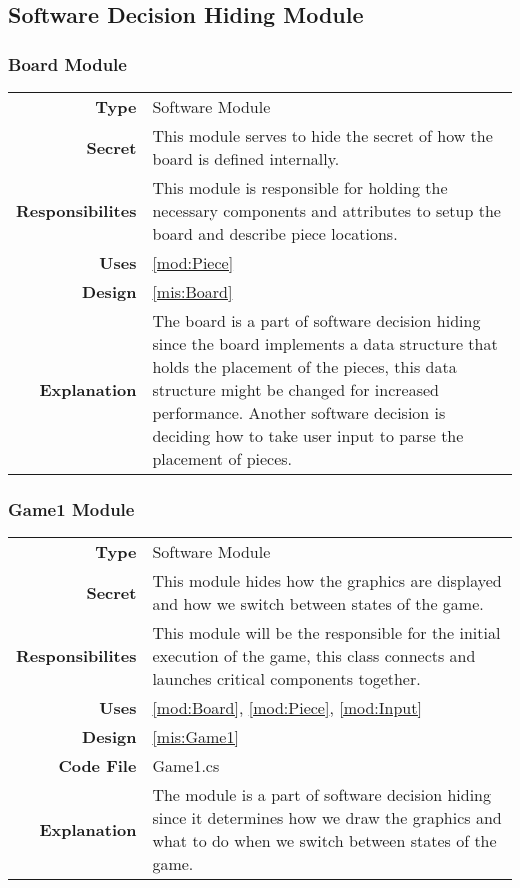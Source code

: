 \documentclass[10pt]{article}
\makeatletter
\newcommand{\CustomLabel}[1]{\Hy@raisedlink{\hypertarget{#1}{}}\label{#1}}
\makeatother
\begin{document}
\subsection{Software Decision Hiding Module}

    \subsubsection{Board Module}\CustomLabel{mod:Board}
        \begin{tabularx}{\linewidth}{ >{\bfseries}r X }
            Type            & Software Module \\
            Secret          & This module serves to hide the secret of how the board is defined internally. \\
            Responsibilites & This module is responsible for holding the necessary components and attributes to setup the board and describe piece locations. \\
            Uses            & \ref{mod:Piece} \\
            Design          & \ref{mis:Board} \\
            Explanation     & The board is a part of software decision hiding since the board implements a data structure that holds the placement of the pieces, this data structure might be changed for increased performance. Another software decision is deciding how to take user input to parse the placement of pieces. \\
        \end{tabularx}

    \subsubsection{Game1 Module}\CustomLabel{mod:Game1}
        \begin{tabularx}{\linewidth}{ >{\bfseries}r X }
            Type            & Software Module \\
            Secret          & This module hides how the graphics are displayed and how we switch between states of the game. \\
            Responsibilites & This module will be the responsible for the initial execution of the game, this class connects and launches critical components together. \\
            Uses            & \ref{mod:Board}, \ref{mod:Piece}, \ref{mod:Input} \\
            Design          & \ref{mis:Game1} \\
            Code File       & Game1.cs \\
            Explanation     & The module is a part of software decision hiding since it determines how we draw the graphics and what to do when we switch between states of the game. \\
        \end{tabularx}
        
\end{document}
